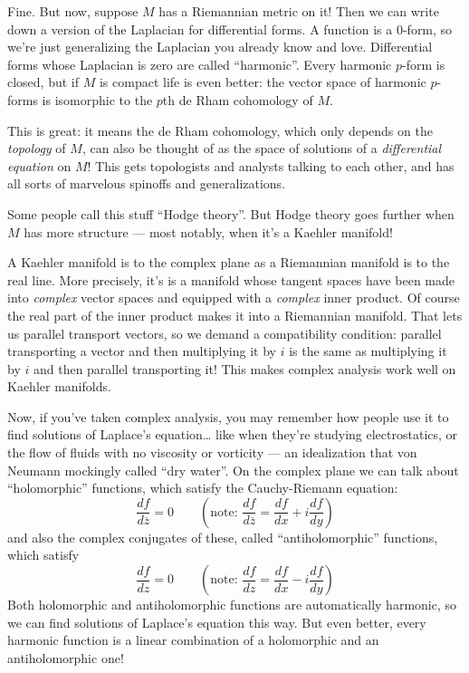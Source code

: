 \documentclass{article}
\begin{document}
Fine. But now, suppose \(M\) has a Riemannian metric on it! Then we can
write down a version of the Laplacian for differential forms. A function
is a \(0\)-form, so we're just generalizing the Laplacian you already
know and love. Differential forms whose Laplacian is zero are called
``harmonic''. Every harmonic \(p\)-form is closed, but if \(M\) is
compact life is even better: the vector space of harmonic \(p\)-forms is
isomorphic to the \(p\)th de Rham cohomology of \(M\).

This is great: it means the de Rham cohomology, which only depends on
the \emph{topology} of \(M\), can also be thought of as the space of
solutions of a \emph{differential equation} on \(M\)! This gets
topologists and analysts talking to each other, and has all sorts of
marvelous spinoffs and generalizations.

Some people call this stuff ``Hodge theory''. But Hodge theory goes
further when \(M\) has more structure --- most notably, when it's a
Kaehler manifold!

A Kaehler manifold is to the complex plane as a Riemannian manifold is
to the real line. More precisely, it's is a manifold whose tangent
spaces have been made into \emph{complex} vector spaces and equipped
with a \emph{complex} inner product. Of course the real part of the
inner product makes it into a Riemannian manifold. That lets us parallel
transport vectors, so we demand a compatibility condition: parallel
transporting a vector and then multiplying it by \(i\) is the same as
multiplying it by \(i\) and then parallel transporting it! This makes
complex analysis work well on Kaehler manifolds.

Now, if you've taken complex analysis, you may remember how people use
it to find solutions of Laplace's equation\ldots{} like when they're
studying electrostatics, or the flow of fluids with no viscosity or
vorticity --- an idealization that von Neumann mockingly called ``dry
water''. On the complex plane we can talk about ``holomorphic''
functions, which satisfy the Cauchy-Riemann equation: \[
  \frac{df}{d\overline{z}} = 0
  \qquad
  \left(
    \text{note:}\,\,
    \frac{df}{d\overline{z}} = \frac{df}{dx} + i\frac{df}{dy}
  \right)
\] and also the complex conjugates of these, called ``antiholomorphic''
functions, which satisfy \[
  \frac{df}{dz} = 0
  \qquad
  \left(
    \text{note:}\,\,
    \frac{df}{dz} = \frac{df}{dx} - i\frac{df}{dy}
  \right)
\] Both holomorphic and antiholomorphic functions are automatically
harmonic, so we can find solutions of Laplace's equation this way. But
even better, every harmonic function is a linear combination of a
holomorphic and an antiholomorphic one!
\end{document}
